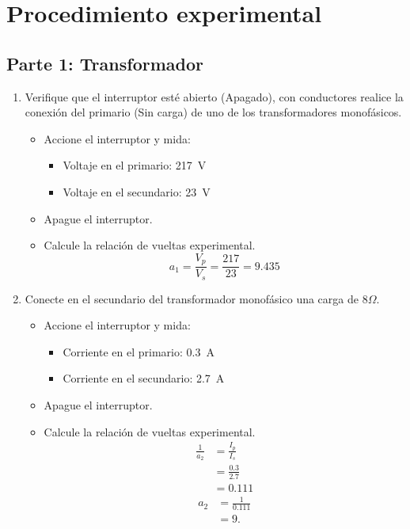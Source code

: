 \documentclass[12pt,a4paper]{article}
\begin{document}
\section{Procedimiento experimental}

\subsection{Parte 1: Transformador}

\begin{enumerate}
    \item Verifique que el interruptor esté abierto (Apagado), con conductores realice la conexión del primario (Sin carga) de uno de los transformadores monofásicos.
    \begin{itemize}
        \item Accione el interruptor y mida:
        \begin{itemize}
            \item Voltaje en el primario: \SI{217}{\volt}
            \item Voltaje en el secundario: \SI{23}{\volt}
        \end{itemize}
        \item Apague el interruptor.
        \item Calcule la relación de vueltas experimental.
        \begin{equation*}
            a_1=\frac{V_p}{V_s}=\frac{217}{23}=9.435
        \end{equation*}
    \end{itemize}
    \item Conecte en el secundario del transformador monofásico una carga de 8$\Omega$.
    \begin{itemize}
        \item Accione el interruptor y mida:
        \begin{itemize}
            \item Corriente en el primario: \SI{0.3}{\ampere}
            \item Corriente en el secundario: \SI{2.7}{\ampere}
        \end{itemize}
        \item Apague el interruptor.
        \item Calcule la relación de vueltas experimental.
        \begin{align*}
            \frac{1}{a_2}&=\frac{I_p}{I_s}\\
            &=\frac{0.3}{2.7}\\
            &=0.111
        \end{align*}
        \begin{align*}
            a_2&=\frac{1}{0.111}\\
            &=9.
        \end{align*}
    \end{itemize}
\end{enumerate}
\end{document}
